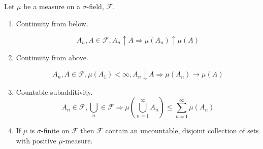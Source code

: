 \documentclass[11pt,fleqn]{book} %
\begin{document}
	\begin{theorem}
		Let $\mu$ be a measure on a $\sigma$-field, $\mathcal{F}$. 

			\begin{enumerate}
				\item Continuity from below. 

					$$A_n, A\in\mathcal{F}, A_n \uparrow A \Rightarrow \mu(A_n) \uparrow \mu(A) $$
				\item Continuity from above.

					$$A_n, A\in\mathcal{F}, \mu(A_1) < \infty, A_n \downarrow A \Rightarrow \mu(A_n) \rightarrow \mu(A) $$

				\item Countable subadditivity.
					$$A_n \in \mathcal{F}, \bigcup_n \in \mathcal{F} \Rightarrow \mu(\bigcup^\infty_{n=1} A_n) \leq \displaystyle \sum^\infty_{n=1} \mu(A_n)  $$

				\item If $\mu$ is $\sigma$-finite on $\mathcal{F}$ then $\mathcal{F}$ contain  an uncountable, disjoint collection of sets with positive $\mu$-measure.

			\end{enumerate}
	\end{theorem}
\end{document}

